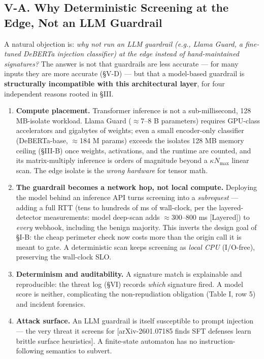 \subsection{V-A. Why Deterministic Screening at the Edge, Not an LLM
Guardrail}\label{v-a-why-deterministic-screening-at-the-edge-not-an-llm-guardrail}

A natural objection is: \emph{why not run an LLM guardrail (e.g., Llama
Guard, a fine-tuned DeBERTa injection classifier) at the edge instead of
hand-maintained signatures?} The answer is not that guardrails are less
accurate --- for many inputs they are more accurate (§V-D) --- but that
a model-based guardrail is \textbf{structurally incompatible with this
architectural layer}, for four independent reasons rooted in §III.

\begin{enumerate}
\def\labelenumi{\arabic{enumi}.}
\tightlist
\item
  \textbf{Compute placement.} Transformer inference is not a
  sub-millisecond, 128 MB-isolate workload. Llama Guard ($\approx$7--8 B
  parameters) requires GPU-class accelerators and gigabytes of weights;
  even a small encoder-only classifier (DeBERTa-base, $\approx$184 M params)
  exceeds the isolate\textquotesingle s 128 MB memory ceiling (§III-B)
  once weights, activations, and the runtime are counted, and its
  matrix-multiply inference is orders of magnitude beyond a
  \(\kappa N_{\max}\) linear scan. The edge isolate is the \emph{wrong
  hardware} for tensor math.
\item
  \textbf{The guardrail becomes a network hop, not local compute.}
  Deploying the model behind an inference API turns screening into a
  \emph{subrequest} --- adding a full RTT (tens to hundreds of ms of
  wall-clock, per the layered-detector measurements: model deep-scan
  adds $\approx$300--800 ms {[}Layered{]}) to \emph{every} webhook, including
  the benign majority. This inverts the design goal of §I-B: the cheap
  perimeter check now costs more than the origin call it is meant to
  gate. A deterministic scan keeps screening as \emph{local CPU}
  (I/O-free), preserving the wall-clock SLO.
\item
  \textbf{Determinism and auditability.} A signature match is
  explainable and reproducible: the threat log (§VI) records
  \emph{which} signature fired. A model score is neither, complicating
  the non-repudiation obligation (Table I, row 5) and incident
  forensics.
\item
  \textbf{Attack surface.} An LLM guardrail is itself susceptible to
  prompt injection --- the very threat it screens for
  {[}arXiv-2601.07185 finds SFT defenses learn brittle surface
  heuristics{]}. A finite-state automaton has no instruction-following
  semantics to subvert.
\end{enumerate}

